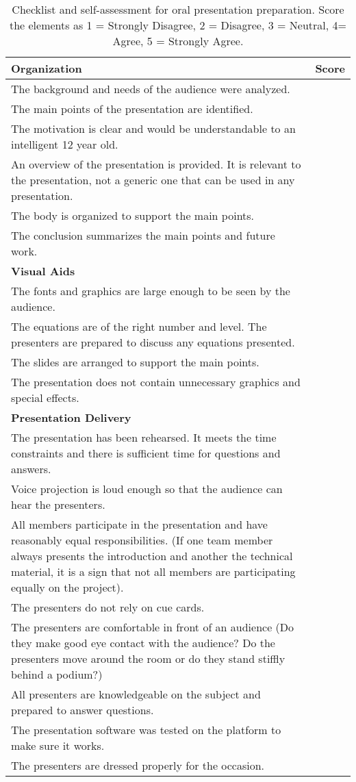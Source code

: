 \begin{table}
\caption{Checklist and self-assessment for oral presentation
preparation. Score the elements as 1 = Strongly Disagree, 2 = Disagree,
3 = Neutral, 4= Agree, 5 = Strongly Agree.}
\label{table:<context>}
\begin{tabular}{|m{13cm}|m{2cm}|}
\hline

\textbf{Organization} &  \textbf{Score} \\ \hline

The background and needs of the audience were analyzed. & \\ \hline
The main points of the presentation are identified. & \\ \hline
The motivation is clear and would be understandable to an intelligent 12
year old. & \\ \hline
An overview of the presentation is provided. It is relevant to the
presentation, not a generic one that can be used in any presentation.
& \\ \hline
The body is organized to support the main points. & \\ \hline
The conclusion summarizes the main points and future work. & \\ \hline
\textbf{Visual Aids} & \\ \hline
The fonts and graphics are large enough to be seen by the audience. & \\ \hline
The equations are of the right number and level. The presenters are
prepared to discuss any equations presented. & \\ \hline
The slides are arranged to support the main points. & \\ \hline
The presentation does not contain unnecessary graphics and special
effects. & \\ \hline
\textbf{Presentation Delivery} & \\ \hline
The presentation has been rehearsed. It meets the time constraints and
there is sufficient time for questions and answers. & \\ \hline
Voice projection is loud enough so that the audience can hear the
presenters. & \\ \hline
All members participate in the presentation and have reasonably equal
responsibilities. (If one team member always presents the introduction
and another the technical material, it is a sign that not all members
are participating equally on the project). & \\ \hline
The presenters do not rely on cue cards. & \\ \hline
The presenters are comfortable in front of an audience (Do they make
good eye contact with the audience? Do the presenters move around the
room or do they stand stiffly behind a podium?) & \\ \hline
All presenters are knowledgeable on the subject and prepared to answer
questions. & \\ \hline
The presentation software was tested on the platform to make sure it
works. & \\ \hline
The presenters are dressed properly for the occasion. & \\ \hline


\end{tabular}
\end{table}
